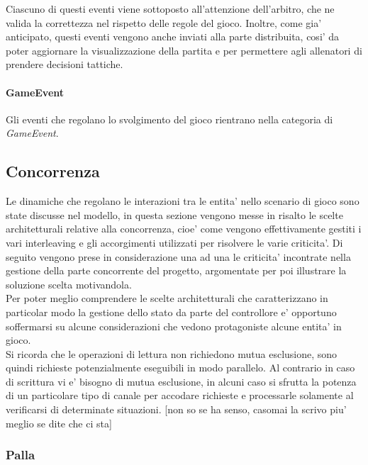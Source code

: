 Ciascuno di questi eventi viene sottoposto all'attenzione dell'arbitro, che ne valida la correttezza nel rispetto delle regole del gioco. Inoltre, come gia' anticipato, questi eventi vengono anche inviati alla parte distribuita, cosi' da poter aggiornare la visualizzazione della partita e per permettere agli allenatori di prendere decisioni tattiche.

\paragraph{GameEvent} Gli eventi che regolano lo svolgimento del gioco rientrano nella categoria di \textit{GameEvent}.

\subsection{Concorrenza}
\label{sec:analisi_concorrenza}

Le dinamiche che regolano le interazioni tra le entita' nello scenario di gioco sono state discusse nel modello, in questa sezione vengono messe in risalto le scelte architetturali relative alla concorrenza, cioe' come vengono effettivamente gestiti i vari interleaving e gli accorgimenti utilizzati per risolvere le varie criticita'. Di seguito vengono prese in considerazione una ad una le criticita' incontrate nella gestione della parte concorrente del progetto, argomentate per poi illustrare la soluzione scelta motivandola.\\

Per poter meglio comprendere le scelte architetturali che caratterizzano in particolar modo la gestione dello stato da parte del controllore e' opportuno soffermarsi su alcune considerazioni che vedono protagoniste alcune entita' in gioco.\\

Si ricorda che le operazioni di lettura non richiedono mutua esclusione, sono quindi richieste potenzialmente eseguibili in modo parallelo. Al contrario in caso di scrittura vi e' bisogno di mutua esclusione, in alcuni caso si sfrutta la potenza di un particolare tipo di canale per accodare richieste e processarle solamente al verificarsi di determinate situazioni. [non so se ha senso, casomai la scrivo piu' meglio se dite che ci sta]

\subsubsection{Palla}
\label{sec:analisi_concorrenza_palla}


